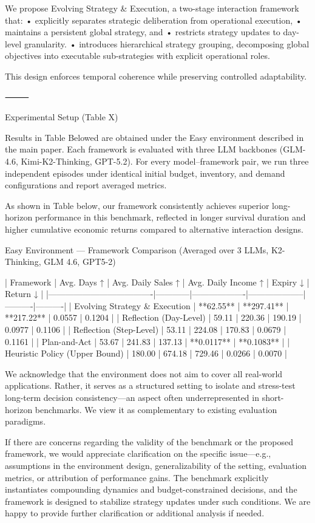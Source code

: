We propose Evolving Strategy & Execution, a two-stage interaction framework that:
	•	explicitly separates strategic deliberation from operational execution,
	•	maintains a persistent global strategy, and
	•	restricts strategy updates to day-level granularity.
    •	introduces hierarchical strategy grouping, decomposing global objectives into executable sub-strategies with explicit operational roles.
    
This design enforces temporal coherence while preserving controlled adaptability.

⸻

Experimental Setup (Table X)

Results in Table Belowed are obtained under the Easy environment described in the main paper. Each framework is evaluated with three LLM backbones (GLM-4.6, Kimi-K2-Thinking, GPT-5.2). For every model–framework pair, we run three independent episodes under identical initial budget, inventory, and demand configurations and report averaged metrics.

As shown in Table below, our framework consistently achieves superior long-horizon performance in this benchmark, reflected in longer survival duration and higher cumulative economic returns compared to alternative interaction designs.

Easy Environment — Framework Comparison (Averaged over 3 LLMs, K2-Thinking, GLM 4.6, GPT5-2)

| Framework                          | Avg. Days ↑ | Avg. Daily Sales ↑ | Avg. Daily Income ↑ | Expiry ↓ | Return ↓ |
|-------------------------------------|------------|-------------------|--------------------|----------|----------|
| Evolving Strategy & Execution       | **62.55**  | **297.41**        | **217.22**         | 0.0557   | 0.1204   |
| Reflection (Day-Level)              | 59.11      | 220.36            | 190.19             | 0.0977   | 0.1106   |
| Reflection (Step-Level)             | 53.11      | 224.08            | 170.83             | 0.0679   | 0.1161   |
| Plan-and-Act                        | 53.67      | 241.83            | 137.13             | **0.0117** | **0.1083** |
| Heuristic Policy (Upper Bound)      | 180.00     | 674.18            | 729.46             | 0.0266   | 0.0070   |

We acknowledge that the environment does not aim to cover all real-world applications. Rather, it serves as a structured setting to isolate and stress-test long-term decision consistency—an aspect often underrepresented in short-horizon benchmarks. We view it as complementary to existing evaluation paradigms.

If there are concerns regarding the validity of the benchmark or the proposed framework, we would appreciate clarification on the specific issue—e.g., assumptions in the environment design, generalizability of the setting, evaluation metrics, or attribution of performance gains. The benchmark explicitly instantiates compounding dynamics and budget-constrained decisions, and the framework is designed to stabilize strategy updates under such conditions. We are happy to provide further clarification or additional analysis if needed.